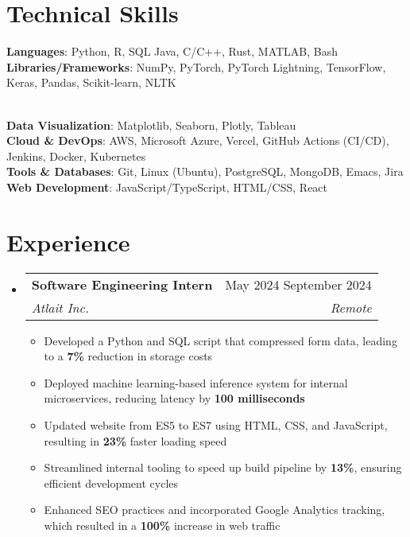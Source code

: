 \documentclass[letterpaper, 11pt]{article}
\makeatletter
\newcommand{\resumeItem}[1]{
    \item \small {
        {#1 \vspace{-3pt}} %
    }
}
\newcommand{\resumeSubheading}[4]{ %
  \vspace{-2pt}\item
    \begin{tabular*}{0.99\textwidth}[t]{l@{\extracolsep{\fill}}r}
      \textbf{#1} & #2 \\
      \textit{\small#3} & \textit{\small #4} \\
    \end{tabular*}\vspace{-7pt}
}
\newcommand{\resumeSubHeadingListStart}{\begin{itemize}[leftmargin=0.15in, label={}]}
\newcommand{\resumeSubHeadingListEnd}{\end{itemize}}
\newcommand{\resumeItemListStart}{\begin{itemize}}
\newcommand{\resumeItemListEnd}{\end{itemize}\vspace{-10pt}}
\makeatother
\begin{document}
\section{Technical Skills}
 \begin{itemize}[leftmargin=0.25in, label={}]
    \small{\item{
     \textbf{Languages}{: Python, R, SQL Java, C/C++, Rust, MATLAB, Bash} \\
     \textbf{Libraries/Frameworks}{: NumPy, PyTorch, PyTorch Lightning, TensorFlow, Keras, Pandas, Scikit-learn, NLTK}
    }} \\
    \textbf{Data Visualization}{: Matplotlib, Seaborn, Plotly, Tableau} \\
    \textbf{Cloud \& DevOps}{: AWS, Microsoft Azure, Vercel, GitHub Actions (CI/CD), Jenkins, Docker, Kubernetes} \\
     \textbf{Tools \& Databases}{: Git, Linux (Ubuntu), PostgreSQL, MongoDB,  Emacs, Jira} \\
     \textbf{Web Development}{: JavaScript/TypeScript, HTML/CSS, React} 
 \end{itemize}

\vspace{-25pt}

\section{Experience}
    \resumeSubHeadingListStart{}
        \resumeSubheading %
        {Software Engineering Intern}{May 2024 \textendash{} September 2024}
        {Atlait Inc.}{Remote}
        \resumeItemListStart{}
            \resumeItem{Developed a Python and SQL script that compressed form data, leading to a \textbf{7\%} reduction in storage costs}
            \resumeItem{Deployed machine learning-based inference system for internal microservices, reducing latency by \textbf{100 milliseconds}}
            \resumeItem{Updated website from ES5 to ES7 using HTML, CSS, and JavaScript, resulting in \textbf{23\%} faster loading speed}
            \resumeItem{Streamlined internal tooling to speed up build pipeline by \textbf{13\%}, ensuring efficient development cycles}
            \resumeItem{Enhanced SEO practices and incorporated Google Analytics tracking, which resulted in a \textbf{100\%} increase in web traffic}
        \resumeItemListEnd{}
    \resumeSubHeadingListEnd{}

\vspace{-20pt}

\end{document}
